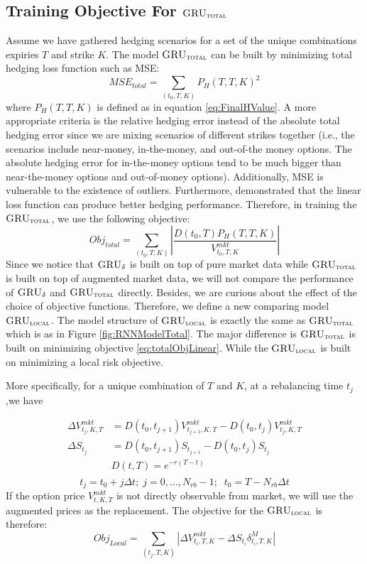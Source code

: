 \documentclass[letterpaper,12pt,titlepage,oneside,final]{book}
\numberwithin{equation}{section}
\theoremstyle{definition}
\newcommand{\model}{\textsc{GRU}_\delta}
\newcommand{\modelT}{\textsc{GRU}_{\textsc{total}}}
\newcommand{\modelL}{\textsc{GRU}_{\textsc{local}}}
\newcommand{\DS}{\Delta S}
\newcommand{\DT}{\Delta t}
\newcommand{\Vmkt}{V^{mkt}}
\newcommand{\Smkt}{S}
\begin{document}
\subsection{Training Objective For $\modelT$}
\label{sec:TotalModelObj}
Assume we have gathered hedging scenarios for a set of the unique combinations expiries $T$ and strike $K$.  
The model $\modelT$ can be built by minimizing total hedging loss function such as MSE:
\[
MSE_{total}=\sum_{(t_0,T,K)} P_H(T,T,K)^2
\]
where $P_H(T,T,K)$ is defined as in equation \eqref{eq:FinalHValue}.
A more appropriate criteria is the relative hedging error instead of the absolute total hedging error since we are mixing scenarios of different strikes together (i.e., the scenarios include near-money, in-the-money, and out-of-the money options. The absolute hedging error for in-the-money options tend to be much bigger than  near-the-money options and out-of-money options). Additionally, MSE is vulnerable to the existence of outliers. Furthermore, \citet{coleman2007total} demonstrated that the linear loss function can produce better hedging performance. Therefore, in training the $\modelT$, we use the following objective:
\begin{equation}
Obj_{total}=\sum_{(t_0,T,K)} \left|\frac{D(t_0,T)  P_H(T,T,K)}{\Vmkt_{t_0,T,K}}\right|
\label{eq:totalObjLinear}
\end{equation}
Since we notice that $\model$ is built on top of pure market data while $\modelT$ is built on top of augmented market data, we will not compare the performance of  $\model$ and $\modelT$ directly. Besides, we are curious about the effect of the choice of objective functions. Therefore, we define a new comparing model $\modelL$. The model structure of $\modelL$ is exactly the same as  $\modelT$ which is as in Figure \ref{fig:RNNModelTotal}.  The major difference is $\modelT$ is built on minimizing objective \eqref{eq:totalObjLinear}. While the $\modelL$ is built on minimizing a local risk objective.

More specifically, for a unique combination of $T$ and $K$,  at a rebalancing time $t_j$ ,we have

\[
\begin{split}
\Delta V^{mkt}_{t_j,K,T}& =D(t_0,t_{j+1}) V^{mkt}_{t_{j+1},K,T}-D(t_0,t_{j})V^{mkt}_{t_j,K,T}\\
\Delta \Smkt_{t_j} &=D(t_0,t_{j+1}) \Smkt_{t_{j+1}}-D(t_0,t_{j}) \Smkt_{t_{j}}\\
&D(t,T)=e^{-r(T-t)}\\
\end{split}
\]
\[
t_j=t_0+j \Delta t;\; j=0,\dots,N_{rb}-1;\;\;t_0=T-N_{rb}\DT
\] 
If the option price $V^{mkt}_{t,K,T}$ is not directly observable from market, we will use the augmented prices as the replacement.
The objective for the  $\modelL$  is therefore:
\begin{equation}
Obj_{Local}=\sum_{(t_j,T,K)} |\Delta V^{mkt}_{t_i,T,K}-\DS_{t_i} \delta^{M}_{t_i,T,K}|
\label{eq:LocalObjNew}
\end{equation}
\end{document}

